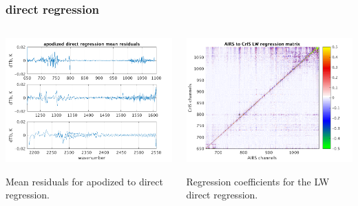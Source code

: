 \documentclass[10pt]{beamer}
\begin{document}
\begin{frame}
\frametitle{direct regression}
\begin{columns}[t]
\begin{column}{0.5\textwidth}
  \begin{centering}
  \includegraphics[width=\textwidth]{slackfigs/ap_direct_regr.png}
  \end{centering}\vspace{3mm}
  Mean residuals for apodized {\airs} to {\cris} direct regression.

\end{column}
\begin{column}{0.5\textwidth}  
  \begin{centering}
  \includegraphics[width=\textwidth]{slackfigs/full_7377_LW_regr_mat.png}
  \end{centering}\vspace{3mm}
  Regression coefficients for the LW direct regression.

\end{column}
\end{columns}
\end{frame}
\end{document}
